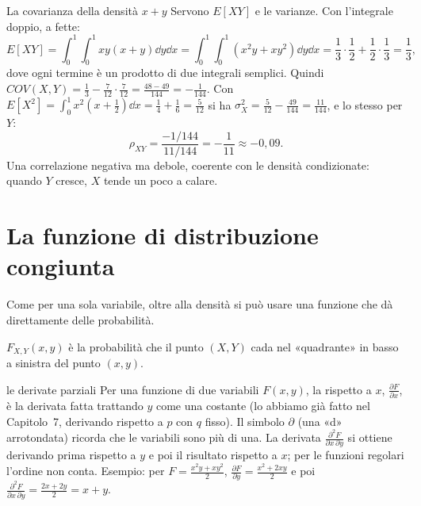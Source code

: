 \begin{esempio}{La covarianza della densità $x + y$}
Servono $E[XY]$ e le varianze. Con l'integrale doppio, a fette:
\[ E[XY] = \int_0^1 \int_0^1 x y (x + y) \dd y \dd x = \int_0^1 \int_0^1 \left( x^2 y + x y^2 \right) \dd y \dd x =
   \frac13 \cdot \frac12 + \frac12 \cdot \frac13 = \frac13 , \]
dove ogni termine è un prodotto di due integrali semplici. Quindi
$COV(X, Y) = \frac13 - \frac{7}{12} \cdot \frac{7}{12} = \frac{48 - 49}{144} = -\frac{1}{144}$. Con
$E[X^2] = \int_0^1 x^2 \left( x + \frac12 \right) \dd x = \frac14 + \frac16 = \frac{5}{12}$ si ha
$\sigma_X^2 = \frac{5}{12} - \frac{49}{144} = \frac{11}{144}$, e lo stesso per $Y$:
\[ \rho_{XY} = \frac{-1/144}{11/144} = -\frac{1}{11} \approx -0{,}09 . \]
Una correlazione negativa ma debole, coerente con le densità condizionate: quando $Y$ cresce, $X$ tende un poco a
calare.
\end{esempio}

\section{La funzione di distribuzione congiunta}

Come per una sola variabile, oltre alla densità si può usare una funzione che dà direttamente delle probabilità.


$F_{X,Y}(x, y)$ è la probabilità che il punto $(X, Y)$ cada nel «quadrante» in basso a sinistra del punto $(x, y)$.

\begin{richiamo}{le derivate parziali}
Per una funzione di due variabili $F(x, y)$, la  rispetto a $x$, $\frac{\partial F}{\partial x}$,
è la derivata fatta trattando $y$ come una costante (lo abbiamo già fatto nel Capitolo~7, derivando rispetto a $p$ con
$q$ fisso). Il simbolo $\partial$ (una «d» arrotondata) ricorda che le variabili sono più di una. La derivata
 $\frac{\partial^2 F}{\partial x\, \partial y}$ si ottiene derivando prima rispetto a $y$ e poi il risultato
rispetto a $x$; per le funzioni regolari l'ordine non conta. Esempio: per $F = \frac{x^2 y + x y^2}{2}$,
$\frac{\partial F}{\partial y} = \frac{x^2 + 2xy}{2}$ e poi $\frac{\partial^2 F}{\partial x\, \partial y} = \frac{2x + 2y}{2}
= x + y$.
\end{richiamo}

